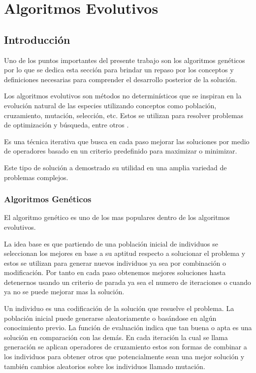 
\chapter{Algoritmos Evolutivos}

\section{Introducción}

Uno de los puntos importantes del presente trabajo son los algoritmos genéticos por lo que se dedica esta sección para  brindar un repaso por los conceptos y definiciones necesarias para comprender el desarrollo posterior de la solución.

Los algoritmos evolutivos son métodos no determinísticos que se inspiran en la evolución natural de las especies utilizando conceptos como población, cruzamiento, mutación, selección, etc. Estos se utilizan para resolver problemas de optimización y búsqueda, entre otros \citep{Nesmachnow2002}.

Es una técnica iterativa que busca en cada paso mejorar las soluciones por medio de operadores basado en un criterio predefinido para maximizar o minimizar.

Este tipo de solución a demostrado su utilidad en una amplia variedad de problemas complejos.


\subsection{Algoritmos Genéticos}
El algoritmo genético es uno de los mas populares dentro de los algoritmos evolutivos.

La idea base es que partiendo de una población inicial de individuos se seleccionan los mejores en base a su aptitud respecto a solucionar el problema y estos se utilizan para generar nuevos individuos ya sea por combinación o modificación. Por tanto en cada paso obtenemos mejores soluciones hasta detenernos usando un criterio de parada ya sea el numero de iteraciones o cuando ya no se puede mejorar mas la solución.

Un individuo es una codificación de la solución que resuelve el problema.
La población inicial puede generarse aleatoriamente o basándose en algún conocimiento previo.
La función de evaluación indica que tan buena o apta es una solución en comparación con las demás.
En cada iteración la cual se llama generación se aplican operadores de cruzamiento estos son formas de combinar a los individuos para obtener otros que potencialmente sean una mejor solución y también cambios aleatorios sobre los individuos llamado mutación.

